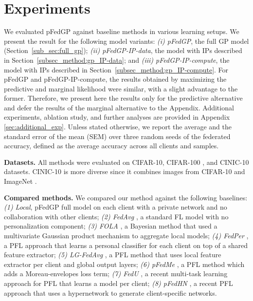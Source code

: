 \documentclass{article}
\def\Secref#1{Section~\ref{#1}}
\begin{document}
\section{Experiments} \label{sec:experiments}

We evaluated pFedGP against baseline methods in various learning setups. We present the result for the following model variants: \textit{(i) pFedGP}, the full GP model (\Secref{sub_sec:full_gp}); \textit{(ii) pFedGP-IP-data}, the model with IPs described in \Secref{subsec_method:gp_IP-data}; and \textit{(iii) pFedGP-IP-compute}, the model with IPs described in \Secref{subsec_method:gp_IP-compute}. For pFedGP and pFedGP-IP-compute, the results obtained by maximizing the predictive and marginal likelihood were similar, with a slight advantage to the former. Therefore, we present here the results only for the predictive alternative and defer the results of the marginal alternative to the Appendix. Additional experiments, ablation study, and further analyses are provided in Appendix \ref{sec:additional_exp}. Unless stated otherwise, we report the average and the standard error of the mean (SEM) over three random seeds of the federated accuracy, defined as the average accuracy across all clients and samples.


\textbf{Datasets.} All methods were evaluated on CIFAR-10, CIFAR-100 \cite{krizhevsky2009learning}, and CINIC-10 \cite{darlow2018cinic} datasets. CINIC-10 is more diverse since it combines images from CIFAR-10 and ImageNet \cite{deng2009imagenet}. 

\textbf{Compared methods.} We compared our method against the following baselines: \textit{(1) Local}, pFedGP full model on each client with a private network and no collaboration with other clients; \textit{(2) FedAvg} \cite{mcmahan2017communication}, a standard FL model with no personalization component; \textit{(3) FOLA} \cite{liu2021bayesian}, a Bayesian method that used a multivariate Gaussian product mechanism to aggregate local models; \textit{(4) FedPer} \cite{arivazhagan2019federated}, a PFL approach that learns a personal classifier for each client on top of a shared feature extractor; \textit{(5) LG-FedAvg} \cite{liang2020think}, a PFL method that uses local feature extractor per client and global output layers; \textit{(6) pFedMe} \cite{t2020personalized}, a PFL method which adds a
Moreau-envelopes loss term; \textit{(7) FedU} \cite{dinh2021fedu}, a recent multi-task learning approach for PFL that learns a model per client; \textit{(8) pFedHN} \cite{shamsian2021personalized_icml}, a recent PFL approach that uses a hypernetwork to generate client-specific networks.
\end{document}

